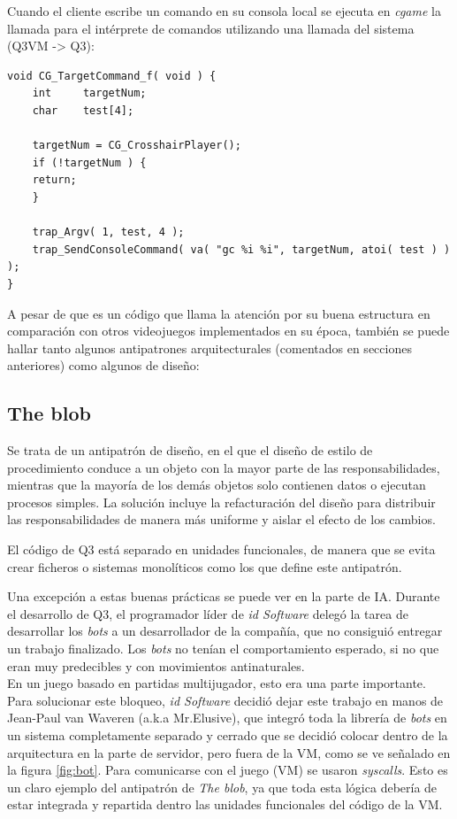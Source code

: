 \documentclass[a4paper,12pt]{report}
\begin{document}
	Cuando el cliente escribe un comando en su consola local se ejecuta en \textit{cgame} la llamada para el intérprete de comandos utilizando una llamada del sistema (Q3VM -> Q3):\\
	
	\begin{lstlisting}[style=C, numbers=none]
void CG_TargetCommand_f( void ) {
    int		targetNum;
    char	test[4];
    
    targetNum = CG_CrosshairPlayer();
    if (!targetNum ) {
    return;
    }
    
    trap_Argv( 1, test, 4 );
    trap_SendConsoleCommand( va( "gc %i %i", targetNum, atoi( test ) ) );
}
	\end{lstlisting}
	
A pesar de que es un código que llama la atención por su buena estructura en comparación con otros videojuegos implementados en su época, también se puede hallar tanto algunos antipatrones arquitecturales (comentados en secciones anteriores) como algunos de diseño:\\

\subsection{The blob}

Se trata de un antipatrón de diseño, en el que el diseño de estilo de procedimiento conduce a un objeto con la mayor parte de las responsabilidades, mientras que la mayoría de los demás objetos solo contienen datos o ejecutan procesos simples. La solución incluye la refacturación del diseño para distribuir las responsabilidades de manera más uniforme y aislar el efecto de los cambios.

El código de Q3 está separado en unidades funcionales, de manera que se evita crear ficheros o sistemas monolíticos como los que define este antipatrón.

Una excepción a estas buenas prácticas se puede ver en la parte de IA. Durante el desarrollo de Q3, el programador líder de \textit{id Software} delegó la tarea de desarrollar los \textit{bots} a un desarrollador de la compañía, que no consiguió entregar un trabajo finalizado. Los \textit{bots} no tenían el comportamiento esperado, si no que eran muy predecibles y con movimientos antinaturales. \\

En un juego basado en partidas multijugador, esto era una parte importante. Para solucionar este bloqueo, \textit{id Software} decidió dejar este trabajo en manos de Jean-Paul van Waveren (a.k.a Mr.Elusive), que integró toda la librería de \textit{bots} en un sistema completamente separado y cerrado que se decidió colocar dentro de la arquitectura en la parte de servidor, pero fuera de la VM, como se ve señalado en la figura \ref{fig:bot}.
Para comunicarse con el juego (VM) se usaron \textit{syscalls}. Esto es un claro ejemplo del antipatrón de \textit{The blob}, ya que toda esta lógica debería de estar integrada y repartida dentro las unidades funcionales del código de la VM.
\end{document}

